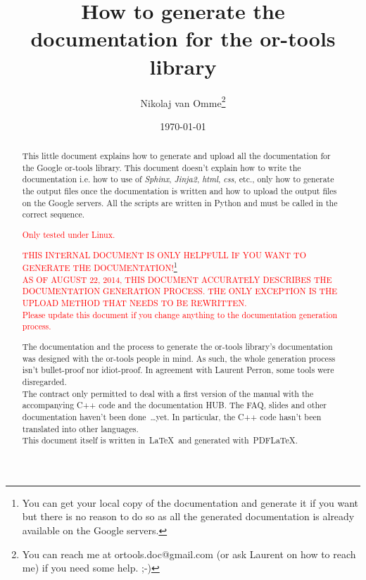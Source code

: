 \documentclass[a4paper,10pt]{article}
\title{How to generate the documentation for the or-tools library}
\author{Nikolaj van Omme\footnote{You can reach me at ortools.doc@gmail.com (or ask Laurent on how to reach me) if you need some help. ;-) }}
\date{\today}
\begin{document}
\maketitle

\begin{abstract}
This little document explains how to generate and upload all the documentation for the Google or-tools library. This document doesn't explain how to write the documentation i.e. how to use of \emph{Sphinx}, \emph{Jinja2}, \emph{html}, \emph{css}, etc., only how to generate the output files once
the documentation is written and how to upload the output files on the Google servers. All the scripts are written in Python and must be called in the correct sequence.\\
\begin{center}\textcolor{red}{Only tested under Linux.}\end{center}
\begin{center}\textcolor{red}{THIS INTERNAL DOCUMENT IS ONLY HELPFULL IF YOU WANT TO GENERATE THE DOCUMENTATION!}\footnote{You can get your local copy of the documentation and generate it if you want but there is no reason to do so as all the generated documentation is already available on the Google servers.}\\
\vspace{0.5cm}
\textcolor{red}{AS OF AUGUST 22, 2014, THIS DOCUMENT ACCURATELY DESCRIBES THE DOCUMENTATION GENERATION PROCESS. THE ONLY EXCEPTION IS THE UPLOAD METHOD THAT NEEDS TO BE REWRITTEN.}\\
\vspace{0.2cm}
\textcolor{red}{Please update this document if you change anything to the documentation generation process.}
\end{center}

The documentation and the process to generate the or-tools library's documentation was designed with the or-tools people in mind. As such, the whole generation process isn't bullet-proof nor idiot-proof. In agreement with Laurent Perron, some tools were disregarded.\\

The contract only permitted to deal with a first version of the manual with the accompanying C++ code and the documentation HUB. The FAQ, slides and other documentation haven't been done~\ldots yet. In particular, the C++ code hasn't been translated into other languages.\\

This document itself is written in~\LaTeX\ and generated with~PDF\LaTeX.

\end{abstract}
\end{document}
